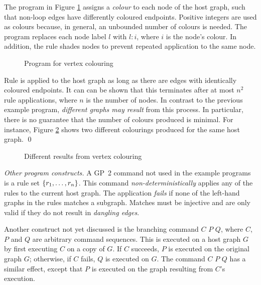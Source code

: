 \begin{example}
The program in Figure \ref{fig:vertex-colouring} assigns a \emph{colour}\/ to each node of the host graph, such that non-loop edges have differently coloured endpoints. Positive integers are used as colours because, in general, an unbounded number of colours is needed. The program replaces each node label $l$\/ with $l{:}i$, where $i$\/ is the node's colour. In addition, the rule  shades nodes to prevent repeated application to the same node.

\begin{figure}[htb]
\begin{center}
 
\end{center}
\caption{Program for vertex colouring}\label{fig:vertex-colouring}
\end{figure}

Rule  is applied to the host graph as long as there are edges with identically coloured endpoints. It can can be shown that this terminates after at most $n^2$ rule applications, where $n$\/ is the number of nodes. In contrast to the previous example program, \emph{different graphs may result}\/ from this process. In particular, there is no guarantee that the number of colours produced is minimal. For instance, Figure \ref{fig:colour_results} shows two different colourings produced for the same host graph.
\qed
\end{example}

\begin{figure}[htb]
\begin{center}
 
\end{center}
\caption{Different results from vertex colouring}\label{fig:colour_results}
\end{figure}

\vspace{.5\baselineskip}
\noindent
\emph{Other program constructs.}
A GP~2 command not used in the example programs is a rule set $\mathtt{\{}r_1,\dots,r_n\mathtt{\}}$. This command \emph{non-deterministically} applies any of the rules to the current host graph. The application \emph{fails}\/ if none of the left-hand graphs in the rules matches a subgraph. Matches must be injective and are only valid if they do not result in \emph{dangling edges}.

Another construct not yet discussed is the branching command  $C$  $P$  $Q$, where $C$, $P$ and $Q$ are arbitrary command sequences. This is executed on a host graph $G$ by first executing $C$ on a copy of $G$. If $C$ succeeds, $P$\/ is executed on the original graph $G$; otherwise, if $C$ fails, $Q$ is executed on $G$. The command  $C$  $P$  $Q$ has a similar effect, except that $P$\/ is executed on the graph resulting from $C$'s execution. 
